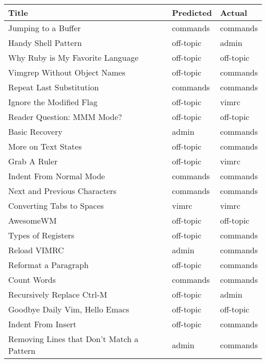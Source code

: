 \begin{tabular}{lll}
\hline
 Title                                     & Predicted   & Actual    \\
\hline
 Jumping to a Buffer                       & commands    & commands  \\
 Handy Shell Pattern                       & off-topic   & admin     \\
 Why Ruby is My Favorite Language          & off-topic   & off-topic \\
 Vimgrep Without Object Names              & off-topic   & commands  \\
 Repeat Last Substitution                  & commands    & commands  \\
 Ignore the Modified Flag                  & off-topic   & vimrc     \\
 Reader Question: MMM Mode?                & off-topic   & off-topic \\
 Basic Recovery                            & admin       & commands  \\
 More on Text States                       & off-topic   & commands  \\
 Grab A Ruler                              & off-topic   & vimrc     \\
 Indent From Normal Mode                   & commands    & commands  \\
 Next and Previous Characters              & commands    & commands  \\
 Converting Tabs to Spaces                 & vimrc       & vimrc     \\
 AwesomeWM                                 & off-topic   & off-topic \\
 Types of Registers                        & off-topic   & commands  \\
 Reload VIMRC                              & admin       & commands  \\
 Reformat a Paragraph                      & off-topic   & commands  \\
 Count Words                               & commands    & commands  \\
 Recursively Replace Ctrl-M                & off-topic   & admin     \\
 Goodbye Daily Vim, Hello Emacs            & off-topic   & off-topic \\
 Indent From Insert                        & off-topic   & commands  \\
 Removing Lines that Don't Match a Pattern & admin       & commands  \\

\end{tabular}
